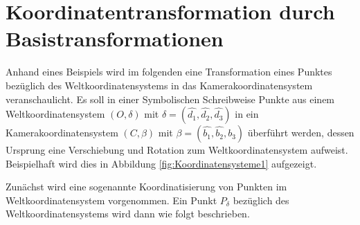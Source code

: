 %
%

\section{Koordinatentransformation durch Basistransformationen}

Anhand eines Beispiels wird im folgenden eine Transformation eines Punktes bezüglich des Weltkoordinatensystems in das Kamerakoordinatensystem veranschaulicht. Es soll in einer Symbolischen Schreibweise Punkte aus einem Weltkoordinatensystem  
$(O,\delta)$ mit $\delta = (\hat{d_1},\hat{d_2},\hat{d_3})$ in ein Kamerakoordinatensystem  $(C,\beta)$ mit $\beta = (\hat{b_1},\hat{b_2},\hat{b_3})$ überführt werden, dessen Ursprung eine Verschiebung und Rotation zum Weltkoordinatensystem aufweist. Beispielhaft wird dies in Abbildung \ref{fig:Koordinatensysteme1} aufgezeigt.
 
	
	
Zunächst wird eine sogenannte Koordinatisierung von Punkten im Weltkoordinatensystem vorgenommen. Ein Punkt $P_\delta$ bezüglich des Weltkoordinatensystems wird dann wie folgt beschrieben.

